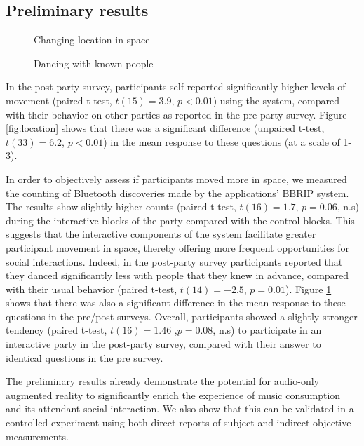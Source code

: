 \documentclass[a4paper,11pt]{article}
\begin{document}
{\subsection{Preliminary results}

\begin{figure}[!htb]
	\def\svgwidth{0.95\columnwidth}
  	
	\caption{Changing location in space}\label{fig:location}
\endminipage\hfill
{}
	\def\svgwidth{0.95\columnwidth}
	
	\caption{Dancing with known people}\label{fig:known}
\endminipage\hfill
\end{figure}

In the post-party survey, participants self-reported significantly higher levels of movement (paired t-test, $t(15)=3.9$, $p<0.01$) using the system, compared with their behavior on other parties as reported in the pre-party survey.
Figure \ref{fig:location} shows that there was a significant difference (unpaired t-test, $t(33)=6.2$, $p<0.01$) in the mean response to these questions (at a scale of 1-3).

In order to objectively assess if participants moved more in space, we measured the counting of Bluetooth discoveries made by the applications' BBRIP system.
The results show slightly higher counts (paired t-test, $t(16)=1.7$, $p=0.06$, n.s) during the interactive blocks of the party compared with the control blocks. This suggests that the interactive components of the system facilitate greater participant movement in space, thereby offering more frequent opportunities for social interactions.
Indeed, in the post-party survey participants reported that they danced significantly less with people that they knew in advance, compared with their usual behavior (paired t-test, $t(14)=-2.5$, $p=0.01$).
Figure \ref{fig:known} shows that there was also a significant difference in the mean response to these questions in the pre/post surveys.
Overall, participants showed a slightly stronger tendency (paired t-test, $t(16)=1.46$ ,$p=0.08$, n.s) to participate in an interactive party in the post-party survey, compared with their answer to identical questions in the pre survey.

The preliminary results already demonstrate the potential for audio-only augmented reality to significantly enrich the experience of music consumption and its attendant social interaction.
We also show that this can be validated in a controlled experiment using both direct reports of subject and indirect objective measurements.

}
\end{document}
